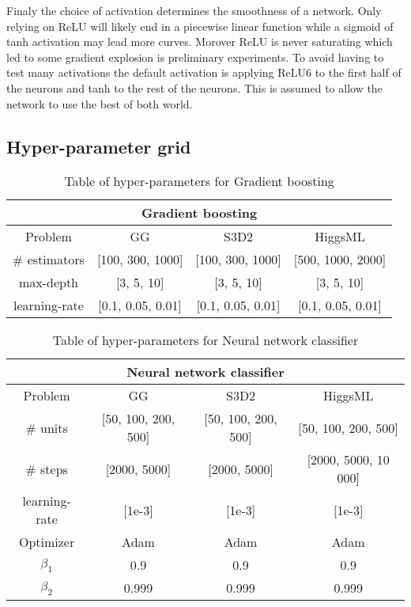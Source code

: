Finaly the choice of activation determines the smoothness of a network.
Only relying on ReLU will likely end in a piecewise linear function while a sigmoid of tanh activation may lead more curves.
Morover ReLU is never saturating which led to some gradient explosion is preliminary experiments. 
To avoid having to test many activations the default activation is applying ReLU6 to the first half of the neurons and tanh to the rest of the neurons.
This is assumed to allow the network to use the best of both world.






\subsection{Hyper-parameter grid} %
\label{sub:hyper_parameter_grid}



\begin{table}[ht!]
\centering
\begin{tabular}{||c c c c||} 
 \hline
 \multicolumn{4}{|c|}{Gradient boosting}\\
 \hline
 Problem & GG & S3D2 & HiggsML \\ [0.5ex] 
 \hline
 \# estimators & [100, 300, 1000] & [100, 300, 1000] & [500, 1000, 2000] \\ 
 max-depth     & [3, 5, 10] & [3, 5, 10] & [3, 5, 10] \\
 learning-rate & [0.1, 0.05, 0.01] & [0.1, 0.05, 0.01] & [0.1, 0.05, 0.01] \\
 \hline
\end{tabular}
\caption{Table of hyper-parameters for Gradient boosting}
\label{table:HP_GB}
\end{table}


\begin{table}[ht!]
\centering
\begin{tabular}{||c c c c||} 
 \hline
 \multicolumn{4}{|c|}{Neural network classifier}\\
 \hline
 Problem & GG & S3D2 & HiggsML \\ [0.5ex] 
 \hline
 \# units & [50, 100, 200, 500] & [50, 100, 200, 500] & [50, 100, 200, 500] \\ 
 \# steps & [2000, 5000] & [2000, 5000] & [2000, 5000, 10 000] \\
 learning-rate & [1e-3] & [1e-3] & [1e-3] \\
 Optimizer & Adam & Adam & Adam \\
 $\beta_1$ & 0.9 & 0.9 & 0.9 \\
 $\beta_2$ & 0.999 & 0.999 & 0.999 \\
 \hline
\end{tabular}
\caption{Table of hyper-parameters for Neural network classifier}
\label{table:HP_NN}
\end{table}


